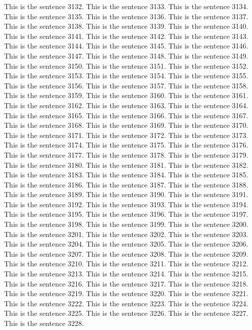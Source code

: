 \documentclass{article}
\begin{document}
This is the sentence 3132.
This is the sentence 3133.
This is the sentence 3134.
This is the sentence 3135.
This is the sentence 3136.
This is the sentence 3137.
This is the sentence 3138.
This is the sentence 3139.
This is the sentence 3140.
This is the sentence 3141.
This is the sentence 3142.
This is the sentence 3143.
This is the sentence 3144.
This is the sentence 3145.
This is the sentence 3146.
This is the sentence 3147.
This is the sentence 3148.
This is the sentence 3149.
This is the sentence 3150.
This is the sentence 3151.
This is the sentence 3152.
This is the sentence 3153.
This is the sentence 3154.
This is the sentence 3155.
This is the sentence 3156.
This is the sentence 3157.
This is the sentence 3158.
This is the sentence 3159.
This is the sentence 3160.
This is the sentence 3161.
This is the sentence 3162.
This is the sentence 3163.
This is the sentence 3164.
This is the sentence 3165.
This is the sentence 3166.
This is the sentence 3167.
This is the sentence 3168.
This is the sentence 3169.
This is the sentence 3170.
This is the sentence 3171.
This is the sentence 3172.
This is the sentence 3173.
This is the sentence 3174.
This is the sentence 3175.
This is the sentence 3176.
This is the sentence 3177.
This is the sentence 3178.
This is the sentence 3179.
This is the sentence 3180.
This is the sentence 3181.
This is the sentence 3182.
This is the sentence 3183.
This is the sentence 3184.
This is the sentence 3185.
This is the sentence 3186.
This is the sentence 3187.
This is the sentence 3188.
This is the sentence 3189.
This is the sentence 3190.
This is the sentence 3191.
This is the sentence 3192.
This is the sentence 3193.
This is the sentence 3194.
This is the sentence 3195.
This is the sentence 3196.
This is the sentence 3197.
This is the sentence 3198.
This is the sentence 3199.
This is the sentence 3200.
This is the sentence 3201.
This is the sentence 3202.
This is the sentence 3203.
This is the sentence 3204.
This is the sentence 3205.
This is the sentence 3206.
This is the sentence 3207.
This is the sentence 3208.
This is the sentence 3209.
This is the sentence 3210.
This is the sentence 3211.
This is the sentence 3212.
This is the sentence 3213.
This is the sentence 3214.
This is the sentence 3215.
This is the sentence 3216.
This is the sentence 3217.
This is the sentence 3218.
This is the sentence 3219.
This is the sentence 3220.
This is the sentence 3221.
This is the sentence 3222.
This is the sentence 3223.
This is the sentence 3224.
This is the sentence 3225.
This is the sentence 3226.
This is the sentence 3227.
This is the sentence 3228.
\end{document}

